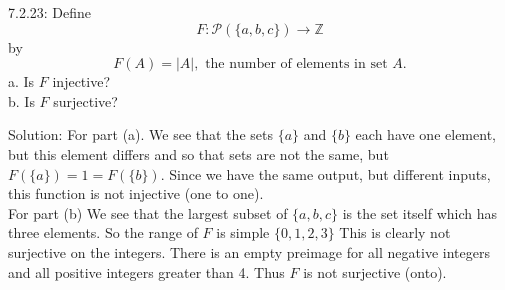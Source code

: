 \documentclass[16 pt]{amsart}
\theoremstyle{definition}
\theoremstyle{remark}
\numberwithin{equation}{subsection}
\newcommand{\Z}{\mathbb{Z}}
\begin{document}
\newpage


7.2.23: Define
\[
F : \mathcal{P}(\{a,b,c\}) \rightarrow \Z
\]
by
\[
F(A) = |A|, \text{ the number of elements in set } A.
\]
a. Is $F$ injective?\\
b. Is $F$ surjective?

\vspace{1in}

Solution: For part (a).  We see that the sets $\{a\}$ and $\{b\}$ each have one element, but this element differs and so that sets are not the same, but $F(\{a\})=1 = F(\{b\})$.  Since we have the same output, but different inputs, this function is not injective (one to one).\\


For part (b) We see that the largest subset of $\{a,b,c\}$ is the set itself which has three elements.  So the range of $F$ is simple $\{0,1,2,3\}$  This is clearly not surjective on the integers.  There is an empty preimage for all negative integers and all positive integers greater than 4.  Thus $F$ is not surjective (onto).
\end{document}
